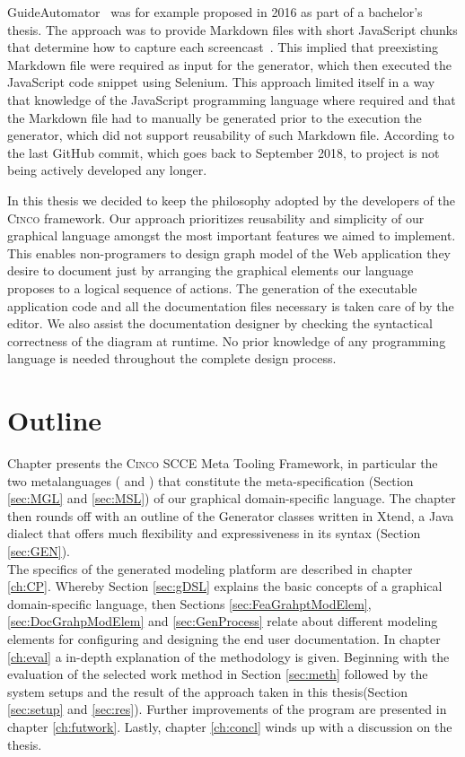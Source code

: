 GuideAutomator~\cite{oliveira2016guideautomator} was for example proposed in 2016 as part of a bachelor's thesis. The approach was to provide Markdown files with short JavaScript chunks that determine how to capture each screencast~\cite{guidAutomatorGitHub}. This implied that preexisting Markdown file were required as input for the generator, which then executed the JavaScript code snippet using Selenium. This approach limited itself in a way that knowledge of the JavaScript programming language where required and that the Markdown file had to manually be generated prior to the execution the generator, which did not support reusability of such Markdown file. According to the last GitHub commit, which goes back to September 2018, to project is not being actively developed any longer.

In this thesis we decided to keep the philosophy adopted by the developers of the \textsc{Cinco} framework. Our approach prioritizes reusability and simplicity of our graphical language amongst the most important features we aimed to implement. This enables non-programers to design graph model of the Web application they desire to document just by arranging the graphical elements our language proposes to a logical sequence of actions. The generation of the executable application code and all the documentation files necessary is taken care of by the editor. We also assist the documentation designer by checking the syntactical correctness of the diagram at runtime. No prior knowledge of any programming language is needed throughout the complete design process.

\section{Outline}\label{sec:outline}

Chapter  presents the \textsc{Cinco} SCCE Meta Tooling Framework, in particular the two metalanguages ( and ) that constitute the meta-specification (Section \ref{sec:MGL} and \ref{sec:MSL}) of our graphical domain-specific language. The chapter then rounds off with an outline of the Generator classes written in Xtend, a Java dialect that offers much flexibility and expressiveness in its syntax (Section \ref{sec:GEN}).\\The specifics of the generated modeling platform are described in chapter \ref{ch:CP}. Whereby Section \ref{sec:gDSL} explains the basic concepts of a graphical domain-specific language, then Sections \ref{sec:FeaGrahptModElem}, \ref{sec:DocGrahpModElem} and \ref{sec:GenProcess} relate about different modeling elements for configuring and designing the end user documentation. In chapter \ref{ch:eval} a in-depth explanation of the methodology is given. Beginning with the evaluation of the selected work method in Section \ref{sec:meth} followed by the system setups and the result of the approach taken in this thesis(Section \ref{sec:setup} and \ref{sec:res}). Further improvements of the program are presented in chapter \ref{ch:futwork}. Lastly, chapter \ref{ch:concl} winds up with a discussion on the thesis.